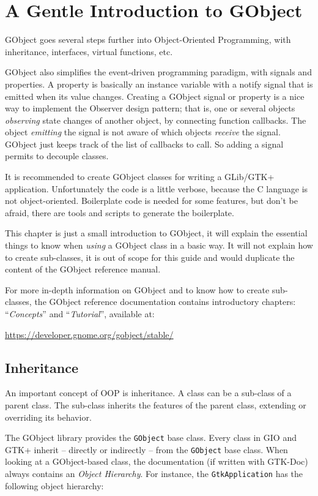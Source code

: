 \chapter{A Gentle Introduction to GObject}
\label{oop-gobject}

GObject goes several steps further into Object-Oriented Programming, with inheritance, interfaces, virtual functions, etc.

GObject also simplifies the event-driven programming paradigm, with signals and properties. A property is basically an instance variable with a notify signal that is emitted when its value changes. Creating a GObject signal or property is a nice way to implement the Observer design pattern; that is, one or several objects \emph{observing} state changes of another object, by connecting function callbacks. The object \emph{emitting} the signal is not aware of which objects \emph{receive} the signal. GObject just keeps track of the list of callbacks to call. So adding a signal permits to decouple classes.

It is recommended to create GObject classes for writing a GLib/GTK+ application. Unfortunately the code is a little verbose, because the C language is not object-oriented. Boilerplate code is needed for some features, but don't be afraid, there are tools and scripts to generate the boilerplate.

This chapter is just a small introduction to GObject, it will explain the essential things to know when \emph{using} a GObject class in a basic way. It will not explain how to create sub-classes, it is out of scope for this guide and would duplicate the content of the GObject reference manual.

For more in-depth information on GObject and to know how to create sub-classes, the GObject reference documentation contains introductory chapters: ``\emph{Concepts}'' and ``\emph{Tutorial}'', available at:

\url{https://developer.gnome.org/gobject/stable/}

\section{Inheritance}

An important concept of OOP is inheritance. A class can be a sub-class of a parent class. The sub-class inherits the features of the parent class, extending or overriding its behavior.

The GObject library provides the \lstinline{GObject} base class. Every class in GIO and GTK+ inherit -- directly or indirectly -- from the \lstinline{GObject} base class. When looking at a GObject-based class, the documentation (if written with GTK-Doc) always contains an \emph{Object Hierarchy}. For instance, the \lstinline{GtkApplication} has the following object hierarchy:

